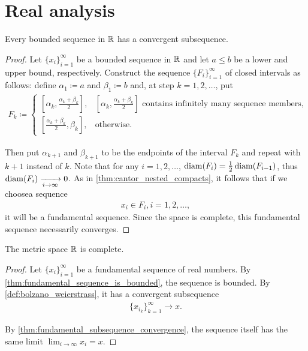 \section{Real analysis}\label{sec:real_analysis}

\begin{theorem}\label{def:bolzano_weierstrass}
  Every bounded sequence in $\mathbb R$ has a convergent subsequence.
\end{theorem}
\begin{proof}
  Let $\{ x_i \}_{i=1}^\infty$ be a bounded sequence in $\mathbb R$ and let $a \leq b$ be a lower and upper bound, respectively. Construct the sequence $\{ F_i \}_{i=1}^\infty$ of closed intervals as follows: define $\alpha_1 \coloneqq a$ and $\beta_1 \coloneqq b$ and, at step $k = 1, 2, \ldots$, put
  \begin{align*}
    F_k \coloneqq \begin{cases}
      [\alpha_k, \tfrac{\alpha_k+\beta_k} 2], &[\alpha_k, \tfrac{\alpha_k+\beta_k} 2]\text{ contains infinitely many sequence members}, \\
      [\tfrac{\alpha_k+\beta_k} 2, \beta_k], &\text{otherwise}.
    \end{cases}
  \end{align*}

  Then put $\alpha_{k+1}$ and $\beta_{k+1}$ to be the endpoints of the interval $F_k$ and repeat with $k+1$ instead of $k$. Note that for any $i = 1, 2, \ldots$, $\operatorname{diam}(F_i) = \tfrac 1 2 \operatorname{diam}(F_{i-1})$, thus $\operatorname{diam}(F_i) \xrightarrow[i \to \infty]{} 0$. As in \cref{thm:cantor_nested_compacts}, it follows that if we choose\AOC a sequence
  \begin{align*}
    x_i \in F_i, i = 1, 2, \ldots,
  \end{align*}
  it will be a fundamental sequence. Since the space is complete, this fundamental sequence necessarily converges.
\end{proof}

\begin{theorem}\label{def:real_numbers_complete_metric_space}
  The metric space $\mathbb R$ is complete.
\end{theorem}
\begin{proof}
  Let $\{ x_i \}_{i=1}^\infty$ be a fundamental sequence of real numbers. By \cref{thm:fundamental_sequence_is_bounded}, the sequence is bounded. By \cref{def:bolzano_weierstrass}, it has a convergent subsequence
  \begin{align*}
    \{ x_{i_k} \}_{k=1}^\infty \to x.
  \end{align*}

  By \cref{thm:fundamental_subsequence_convergence}, the sequence itself has the same limit $\lim_{i \to \infty} x_i = x$.
\end{proof}
